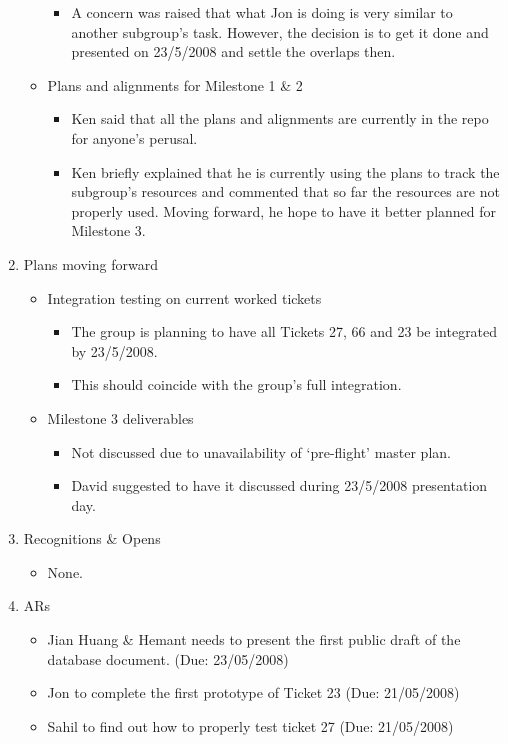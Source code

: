 \documentclass{letter}
\begin{document}
\begin{enumerate}
\begin{itemize}
\begin{itemize}
						\item A concern was raised that what Jon is doing is very similar to another subgroup's task. However, the decision is to get it done and presented on 23/5/2008 and settle the overlaps then. 
				\end{itemize} 
			\item Plans and alignments for Milestone 1 \& 2
				\begin{itemize}
					\item Ken said that all the plans and alignments are currently in the repo for anyone's perusal. 
						\item Ken briefly explained that he is currently using the plans to track the subgroup's resources and commented that so far the resources are not properly used. Moving forward, he hope to have it better planned for Milestone 3.
				\end{itemize}
		\end{itemize}
	\item Plans moving forward
		\begin{itemize}
			\item Integration testing on current worked tickets
				\begin{itemize}
					\item The group is planning to have all Tickets 27, 66 and 23 be integrated by 23/5/2008. 
					\item This should coincide with the group's full integration. 
				\end{itemize}
			\item Milestone 3 deliverables
				\begin{itemize}
					\item Not discussed due to unavailability of `pre-flight' master plan. 
						\item David suggested to have it discussed during 23/5/2008 presentation day.  
				\end{itemize}
		\end{itemize}
	\item Recognitions \& Opens
		\begin{itemize}
			\item None. 
		\end{itemize}
	\item ARs
		\begin{itemize}
			\item Jian Huang \& Hemant needs to present the first public draft of the database document. (Due: 23/05/2008)
			\item Jon to complete the first prototype of Ticket 23 (Due: 21/05/2008)
			\item Sahil to find out how to properly test ticket 27 (Due: 21/05/2008)
		\end{itemize}
\end{enumerate} 
\end{document}
